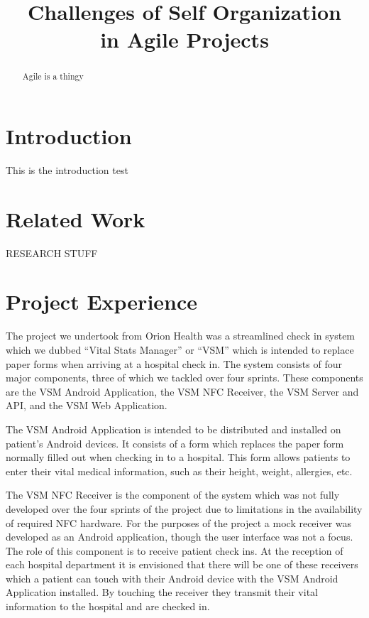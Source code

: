 \documentclass[conference]{IEEEtran}
\begin{document}
\title{Challenges of Self Organization\\in Agile Projects}


\author{
}


\maketitle


\begin{abstract}
Agile is a thingy
\end{abstract}


\section{Introduction} This is the introduction test


\section{Related Work}
RESEARCH STUFF


\section{Project Experience}

The project we undertook from Orion Health was a streamlined check in system
which we dubbed ``Vital Stats Manager'' or ``VSM'' which is intended to replace
paper forms when arriving at a hospital check in. The system consists of four
major components, three of which we tackled over four sprints. These components
are the VSM Android Application, the VSM NFC Receiver, the VSM Server and API,
and the VSM Web Application.

The VSM Android Application is intended to be distributed and installed on
patient's Android devices. It consists of a form which replaces the paper form
normally filled out when checking in to a hospital. This form allows patients to
enter their vital medical information, such as their height, weight, allergies,
etc.

The VSM NFC Receiver is the component of the system which was not fully
developed over the four sprints of the project due to limitations in the
availability of required NFC hardware. For the purposes of the project a mock
receiver was developed as an Android application, though the user interface was
not a focus. The role of this component is to receive patient check ins. At the
reception of each hospital department it is envisioned that there will be one of
these receivers which a patient can touch with their Android device with the VSM
Android Application installed. By touching the receiver they transmit their
vital information to the hospital and are checked in.
\end{document}
